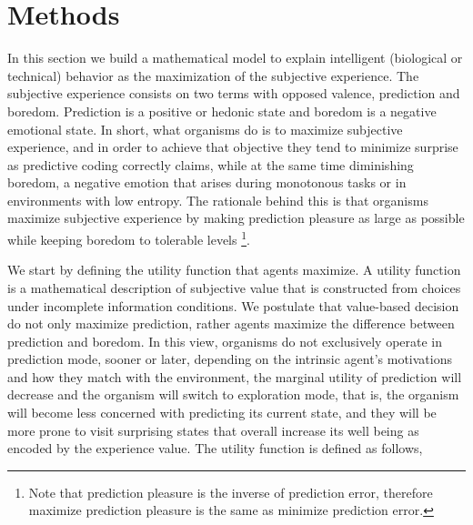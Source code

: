 \documentclass[11pt,twocolumn]{article}
\begin{document}
\section{Methods}
\label{se:methods}

In this section we build a mathematical model to explain intelligent (biological or technical) behavior as the maximization of the subjective experience. 
The subjective experience consists on two terms with opposed valence, prediction and boredom. Prediction is a positive or hedonic state and boredom is a negative emotional state. In short, what organisms do is to maximize subjective experience, and in order to achieve that objective  they tend to minimize surprise as predictive coding correctly claims, while at the same time diminishing boredom, a negative emotion that arises during monotonous tasks or in environments with low entropy. The rationale behind this is that organisms maximize subjective experience by making prediction pleasure as large as possible while keeping boredom to tolerable levels \footnote{Note that prediction pleasure is the inverse of prediction error, therefore maximize prediction pleasure is the same as minimize prediction error.}.


We start by defining the utility function that agents maximize. 
A utility function is a mathematical description of subjective value that is constructed from choices under incomplete information conditions. We postulate that value-based decision do not only maximize prediction, rather agents maximize the difference between prediction and boredom. In this view, organisms do not exclusively operate in prediction mode, sooner or later, depending on the intrinsic agent's motivations and how they match with the environment, the marginal utility of prediction will decrease and the organism will switch to exploration mode, that is, the organism will become less concerned with predicting its current state, and they will be more prone to visit surprising states that overall increase its well being as encoded by the experience value. 
The utility function is defined as follows,
\end{document}
